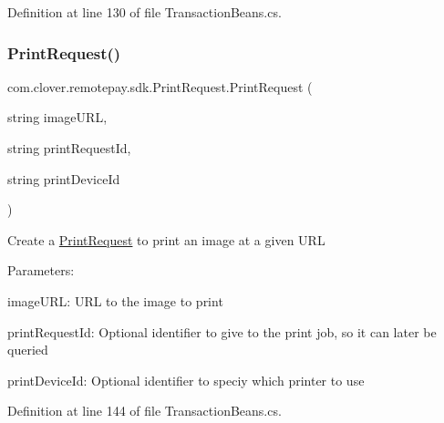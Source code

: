 Definition at line 130 of file Transaction\+Beans.\+cs.

\mbox{\label{classcom_1_1clover_1_1remotepay_1_1sdk_1_1_print_request_a09442753b6abb881e9f3f3ed63c8df24}} 
\subsubsection{\texorpdfstring{Print\+Request()}{PrintRequest()}\hspace{0.1cm}{\footnotesize\ttfamily [3/4]}}
{\footnotesize\ttfamily com.\+clover.\+remotepay.\+sdk.\+Print\+Request.\+Print\+Request (\begin{DoxyParamCaption}\item[{string}]{image\+U\+RL,  }\item[{string}]{print\+Request\+Id,  }\item[{string}]{print\+Device\+Id }\end{DoxyParamCaption})}

Create a \hyperlink{classcom_1_1clover_1_1remotepay_1_1sdk_1_1_print_request}{Print\+Request} to print an image at a given U\+RL


\begin{DoxyItemize}
\item Parameters\+:
\begin{DoxyItemize}
\item image\+U\+RL\+: U\+RL to the image to print
\item print\+Request\+Id\+: Optional identifier to give to the print job, so it can later be queried
\item print\+Device\+Id\+: Optional identifier to speciy which printer to use 
\end{DoxyItemize}
\end{DoxyItemize}

Definition at line 144 of file Transaction\+Beans.\+cs.

\mbox{\label{classcom_1_1clover_1_1remotepay_1_1sdk_1_1_print_request_a5962d2c169afbdf4c5aba28a998b1a3b}} 
